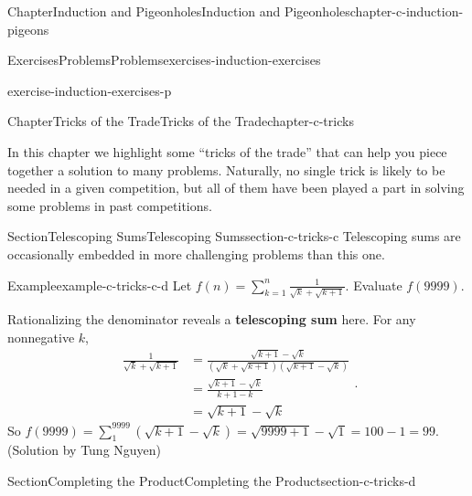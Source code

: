 \documentclass[oneside,10pt,]{book}
\newcommand{\terminology}[1]{\textbf{#1}}
\numberwithin{equation}{section}
\begin{document}
\begin{chapterptx}{Chapter}{Induction and Pigeonholes}{}{Induction and Pigeonholes}{}{}{chapter-c-induction-pigeons}
\begin{exercises-section}{Exercises}{Problems}{}{Problems}{}{}{exercises-induction-exercises}
\begin{divisionexercise}{15}{}{}{exercise-induction-exercises-p}
\end{divisionexercise}%
\end{exercises-section}
\end{chapterptx}
%
%
\typeout{************************************************}
\typeout{************************************************}
%
\begin{chapterptx}{Chapter}{Tricks of the Trade}{}{Tricks of the Trade}{}{}{chapter-c-tricks}
\renewcommand*{\chaptername}{Chapter}
\begin{introduction}{}%
In this chapter we highlight some ``tricks of the trade'' that can help you piece together a solution to many problems.  Naturally, no single trick is likely to be needed in a given competition, but all of them have been played a part in solving some problems in past competitions.%
\end{introduction}%
%
%
\typeout{************************************************}
\typeout{************************************************}
%
\begin{sectionptx}{Section}{Telescoping Sums}{}{Telescoping Sums}{}{}{section-c-tricks-c}
%
Telescoping sums are occasionally embedded in more challenging problems than this one.%
\begin{example}{Example}{}{example-c-tricks-c-d}%
Let \(f(n)=\sum_{k=1}^n \frac{1}{\sqrt{k}+\sqrt{k+1}}\).  Evaluate \(f(9999)\).%
\par
Rationalizing the denominator reveals a \terminology{telescoping sum} here.  For any nonnegative \(k\),%
\begin{equation*}
\begin{split}
\frac{1}{\sqrt{k} + \sqrt{k + 1}} & = \frac{\sqrt{k + 1} - \sqrt{k}}{(\sqrt{k} + \sqrt{k + 1})(\sqrt{k + 1} - \sqrt{k})}\\ 
&= \frac{\sqrt{k + 1} - \sqrt{k}}{k + 1 - k}\\
&= \sqrt{k + 1} - \sqrt{k}
\end{split}\text{.}
\end{equation*}
So \(f(9999) = \sum_{1}^{9999}(\sqrt{k + 1} - \sqrt{k}) = \sqrt{9999 + 1} - \sqrt{1} = 100 - 1 = 99\).  (Solution by Tung Nguyen)%
\end{example}
\end{sectionptx}
%
%
\typeout{************************************************}
\typeout{************************************************}
%
\begin{sectionptx}{Section}{Completing the Product}{}{Completing the Product}{}{}{section-c-tricks-d}

\end{sectionptx}
\end{chapterptx}
\end{document}
